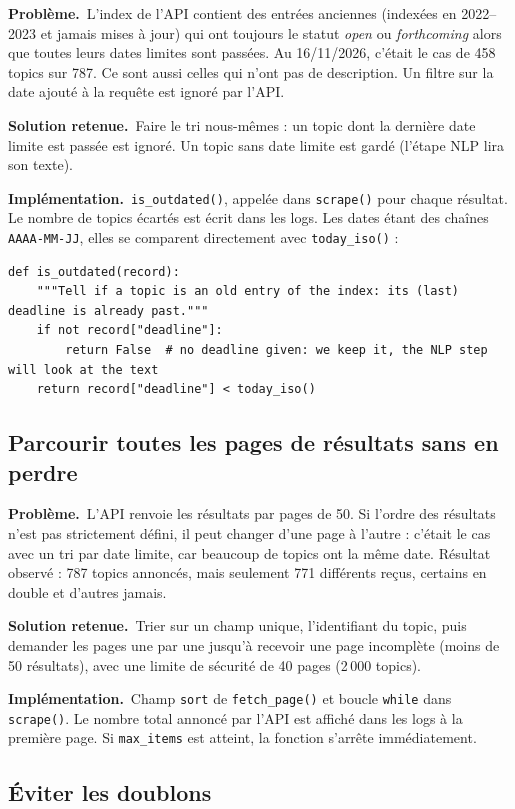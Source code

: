 \documentclass[11pt,a4paper]{article}
\newcommand{\pb}{\par\medskip\noindent\textbf{\textcolor{pbcolor}{Problème.}}\ }
\newcommand{\sol}{\par\medskip\noindent\textbf{\textcolor{solcolor}{Solution retenue.}}\ }
\newcommand{\impl}{\par\medskip\noindent\textbf{\textcolor{implcolor}{Implémentation.}}\ }
\newcommand{\code}[1]{\texttt{#1}}
\begin{document}
\pb L'index de l'API contient des entrées anciennes (indexées en 2022--2023 et jamais mises
à jour) qui ont toujours le statut \emph{open} ou \emph{forthcoming} alors que toutes leurs
dates limites sont passées. Au 16/11/2026, c'était le cas de 458 topics sur 787. Ce sont
aussi celles qui n'ont pas de description. Un filtre sur la date ajouté à la requête est
ignoré par l'API.

\sol Faire le tri nous-mêmes : un topic dont la dernière date limite est passée est ignoré.
Un topic sans date limite est gardé (l'étape NLP lira son texte).

\impl \code{is\_outdated()}, appelée dans \code{scrape()} pour chaque résultat. Le nombre de
topics écartés est écrit dans les logs. Les dates étant des chaînes \code{AAAA-MM-JJ},
elles se comparent directement avec \code{today\_iso()} :

\begin{lstlisting}
def is_outdated(record):
    """Tell if a topic is an old entry of the index: its (last) deadline is already past."""
    if not record["deadline"]:
        return False  # no deadline given: we keep it, the NLP step will look at the text
    return record["deadline"] < today_iso()
\end{lstlisting}

\subsection{Parcourir toutes les pages de résultats sans en perdre}

\pb L'API renvoie les résultats par pages de 50. Si l'ordre des résultats n'est pas
strictement défini, il peut changer d'une page à l'autre : c'était le cas avec un tri par
date limite, car beaucoup de topics ont la même date. Résultat observé : 787 topics
annoncés, mais seulement 771 différents reçus, certains en double et d'autres jamais.

\sol Trier sur un champ unique, l'identifiant du topic, puis demander les pages une par une
jusqu'à recevoir une page incomplète (moins de 50 résultats), avec une limite de sécurité
de 40 pages (2\,000 topics).

\impl Champ \code{sort} de \code{fetch\_page()} et boucle \code{while} dans
\code{scrape()}. Le nombre total annoncé par l'API est affiché dans les logs à la première
page. Si \code{max\_items} est atteint, la fonction s'arrête immédiatement.

\subsection{Éviter les doublons}
\end{document}
